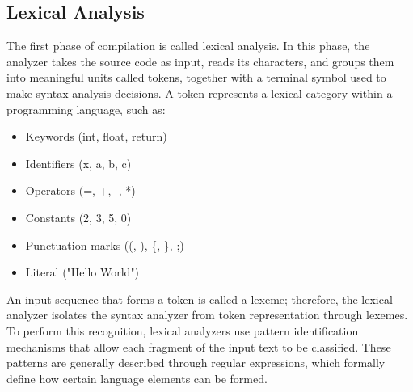 \documentclass[letterpaper,12pt,oneside]{article}
\begin{document}
    \subsection{Lexical Analysis}
    The first phase of compilation is called lexical analysis. In this phase, the analyzer takes the source code as input, reads its characters, and groups them into meaningful units called tokens, together with a terminal symbol used to make syntax analysis decisions. A token represents a lexical category within a programming language, such as:
    \begin{itemize}
        \item Keywords (int, float, return)
        \item Identifiers (x, a, b, c)
        \item Operators (=, +, -, *)
        \item Constants (2, 3, 5, 0)
        \item Punctuation marks ((, ), \{, \}, ;)
        \item Literal ("Hello World")
    \end{itemize}
     An input sequence that forms a token is called a lexeme; therefore, the lexical analyzer isolates the syntax analyzer from token representation through lexemes. To perform this recognition, lexical analyzers use pattern identification mechanisms that allow each fragment of the input text to be classified. These patterns are generally described through regular expressions, which formally define how certain language elements can be formed.\cite{aho2008compiladores}
\end{document}
